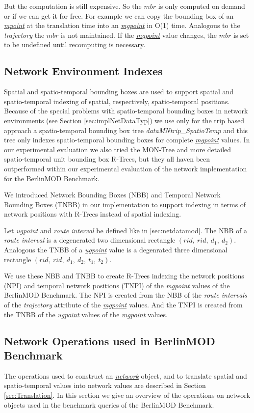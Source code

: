\documentclass[a4paper]{article}
\newcommand{\bmodb} {BerlinMOD Benchmark}
\newcommand{\dt}[1]{\textsl{\underline{#1}}}
\begin{document}
But the computation is still expensive. So the $mbr$ is only computed on demand
or if we can get it for free. For example we can copy
the bounding box of an \dt{mpoint} at the translation time into an \dt{mgpoint}
in O(1) time.
Analogous to the \textit{trajectory} the $mbr$ is not maintained. If
the \dt{mgpoint} value changes, the $mbr$ is set to be undefined until
recomputing
is necessary.

\subsection{Network Environment Indexes}
\label{sec:implNetIndex}
Spatial and spatio-temporal bounding boxes are used to support spatial
and spatio-temporal indexing of spatial, respectively, spatio-temporal
positions.
Because of the special problems with spatio-temporal bounding boxes in network
environments (see Section \ref{sec:implNetDataTyp}) we use only for the trip
based approach a spatio-temporal bounding box tree
\textit{dataMNtrip\_SpatioTemp} and
this tree only indexes spatio-temporal bounding boxes for complete \dt{mgpoint}
values. In our experimental evaluation we also tried the MON-Tree
\cite{MONTreeAlmeidaGeoinformatica} and more
detailed spatio-temporal unit bounding box R-Trees, but they all haven been
outperformed within our experimental evaluation of the network implementation
for the \bmodb{}.

We introduced Network Bounding Boxes (NBB) and Temporal Network Bounding Boxes
(TNBB) in our implementation to support indexing in terms of network positions
with R-Trees instead of spatial indexing.

Let \dt{ugpoint} and \textit{route interval} be defined like in
\ref{sec:netdatamod}.
The NBB of a \textit{route interval} is a degenerated two dimensional
rectangle $(rid,\ rid,\ d_1,\ d_2)$. Analogous the TNBB of a \dt{ugpoint}
value is a degenrated three dimensional rectangle $(rid,\ rid,\ d_1,\ d_2,\
t_1,\ t_2)$.

We use these NBB and TNBB to create R-Trees indexing the network
positions (NPI) and temporal network positions (TNPI) of the \dt{mgpoint} values
of the \bmodb{}. The NPI is created from the NBB of the \textit{route
intervals} of the \textit{trajectory} attribute of the \dt{mgpoint} values. And the
TNPI is created from the TNBB of the \dt{ugpoint} values of the \dt{mgpoint}
values.
\subsection{Network Operations used in \bmodb{}}
\label{sec:implNetOperations}
The operations used to construct an \dt{network} object, and
to translate spatial and spatio-temporal values into network values are
described in Section \ref{sec:Translation}. In this section we give an overview
of the operations on network objects used in the benchmark queries of the
\bmodb{}.
\end{document}
